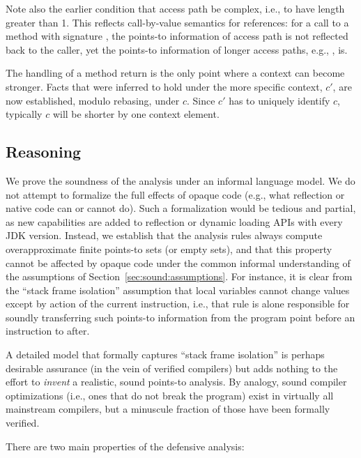 Note also the earlier condition that access path  be complex, i.e., to have length greater than 1. This reflects call-by-value semantics for references: for a call  to a method with signature , the points-to information of access path  is not reflected back to the caller, yet the points-to information of longer access paths, e.g., , is.

The handling of a method return is the only point where a context can become stronger. Facts that were inferred to hold under the more specific context, $c'$, are now established, modulo rebasing, under $c$. Since $c'$ has to uniquely identify $c$, typically $c$ will be shorter by one context element.


\subsection{Reasoning}
\label{sec:sound:reasoning}

We prove the soundness of the analysis under an informal language model. We do not attempt to formalize the full effects of opaque code (e.g., what reflection or native code can or cannot do). Such a formalization would be tedious and partial, as new capabilities are added to reflection or dynamic loading APIs with every JDK version. Instead, we establish that the analysis rules always compute overapproximate finite points-to sets (or empty sets), and that this property cannot be affected by opaque code under the common informal understanding of the assumptions of Section~\ref{sec:sound:assumptions}. For instance, it is clear from the ``stack frame isolation'' assumption that local variables cannot change values except by action of the current instruction, i.e., that rule  is alone responsible for soundly transferring such points-to information from the program point before an instruction to after.

A detailed model that formally captures ``stack frame isolation'' is perhaps desirable assurance (in the vein of verified compilers) but adds nothing to the effort to \emph{invent} a realistic, sound points-to analysis. By analogy, sound compiler optimizations (i.e., ones that do not break the program) exist in virtually all mainstream compilers, but a minuscule fraction of those have been formally verified.

There are two main properties of the defensive analysis: 

